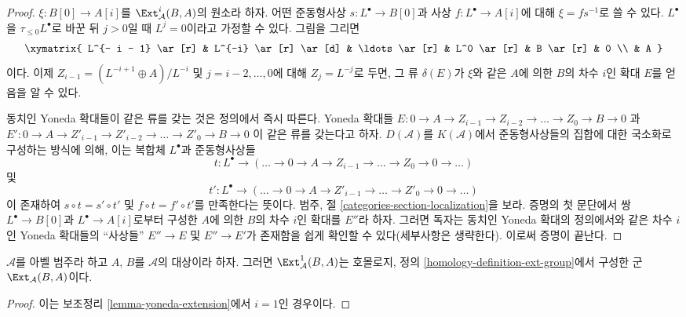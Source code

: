 \begin{proof}
$\xi : B[0] \to A[i]$를 $\Ext^i_\mathcal{A}(B, A)$의 원소라 하자.
어떤 준동형사상 $s : L^\bullet \to B[0]$과 사상
$f : L^\bullet \to A[i]$에 대해 $\xi = f s^{-1}$로 쓸 수 있다.
$L^\bullet$을 $\tau_{\leq 0}L^\bullet$로 바꾼 뒤 $j > 0$일 때
$L^j = 0$이라고 가정할 수 있다. 그림을 그리면
$$
\xymatrix{
L^{- i - 1} \ar[r] & L^{-i} \ar[r] \ar[d] & \ldots \ar[r] &
L^0 \ar[r] & B \ar[r] & 0 \\
& A
}
$$
이다. 이제 $Z_{i - 1} = (L^{- i + 1} \oplus A)/L^{-i}$ 및
$j = i - 2, \ldots, 0$에 대해 $Z_j = L^{-j}$로 두면, 그 류
$\delta(E)$가 $\xi$와 같은 $A$에 의한 $B$의 차수 $i$인 확대 $E$를
얻음을 알 수 있다.

\medskip\noindent
동치인 Yoneda 확대들이 같은 류를 갖는 것은 정의에서 즉시 따른다.
Yoneda 확대들
$E : 0 \to A \to Z_{i - 1} \to Z_{i - 2} \to \ldots \to Z_0 \to B \to 0$
과
$E' : 0 \to A \to Z'_{i - 1} \to Z'_{i - 2} \to \ldots \to Z'_0 \to B \to 0$
이 같은 류를 갖는다고 하자. $D(\mathcal{A})$를
$K(\mathcal{A})$에서 준동형사상들의 집합에 대한 국소화로 구성하는
방식에 의해, 이는 복합체 $L^\bullet$과 준동형사상들
$$
t : L^\bullet \to
(\ldots \to 0 \to A \to Z_{i - 1} \to \ldots \to Z_0 \to 0 \to \ldots)
$$
및
$$
t' : L^\bullet \to
(\ldots \to 0 \to A \to Z'_{i - 1} \to \ldots \to Z'_0 \to 0 \to \ldots)
$$
이 존재하여 $s \circ t = s' \circ t'$ 및
$f \circ t = f' \circ t'$를 만족한다는 뜻이다. 범주, 절
\ref{categories-section-localization}을 보라. 증명의 첫 문단에서
쌍 $L^\bullet \to B[0]$과 $L^\bullet \to A[i]$로부터 구성한
$A$에 의한 $B$의 차수 $i$인 확대를 $E''$라 하자. 그러면 독자는
동치인 Yoneda 확대의 정의에서와 같은 차수 $i$인 Yoneda 확대들의
``사상들'' $E'' \to E$ 및 $E'' \to E'$가 존재함을 쉽게 확인할 수
있다(세부사항은 생략한다). 이로써 증명이 끝난다.
\end{proof}

\begin{lemma}
\label{lemma-ext-1}
$\mathcal{A}$를 아벨 범주라 하고 $A$, $B$를 $\mathcal{A}$의 대상이라
하자. 그러면 $\Ext^1_\mathcal{A}(B, A)$는 호몰로지, 정의
\ref{homology-definition-ext-group}에서 구성한 군
$\Ext_\mathcal{A}(B, A)$이다.
\end{lemma}

\begin{proof}
이는 보조정리 \ref{lemma-yoneda-extension}에서 $i = 1$인 경우이다.
\end{proof}


